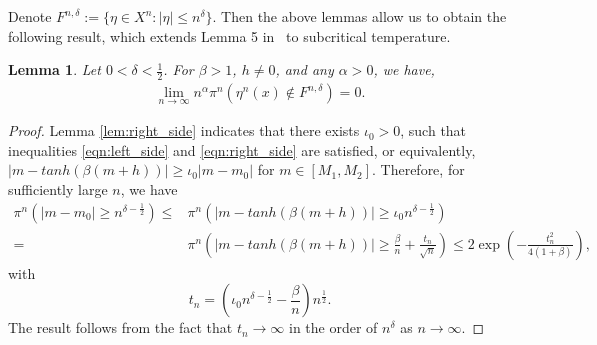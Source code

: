 \documentclass{amsart}
\newcommand{\al}{\alpha}                %
\newcommand{\ra}{\rightarrow}           %
\newtheorem{lem}[thm]{Lemma}
\begin{document}
          Denote
         		$F^{n,\delta}:=\{\eta\in X^n: |\eta|\le n^\delta\}$.
         Then the above lemmas allow us to obtain the following result, which extends Lemma 5 in~\cite{bierkens2017} to subcritical temperature. 
         \begin{lem}
         	\label{lem:outsideF}
         	Let $0<\delta<\frac12$. For $\beta>1$, $h\neq 0$, and any $\al>0$, we have, 
         	\begin{align*}
         		\lim_{n\ra \infty} n^\al \pi^n(\eta^n(x) \notin F^{n,\delta}) =0.
         	\end{align*}
         \end{lem}
         \begin{proof}
         	Lemma \ref{lem:right_side} indicates that there exists $\iota_0>0$, such that inequalities \eqref{eqn:left_side} and \eqref{eqn:right_side} are satisfied,
         	or equivalently, $|m- tanh(\beta(m+h))| \ge \iota_0 |m-m_0|$ for $m \in[M_1, M_2]$. Therefore, for sufficiently large $n$, we have
         	\begin{align*}
         		\pi^n(|m-m_0| \ge n^{\delta-\frac12}) \le&\pi^n(|m- tanh(\beta(m+h))|  \ge \iota_0 n^{\delta-\frac12})
         		\\=& \pi^n\left(|m- tanh(\beta(m+h))|  \ge  \frac{\beta}{n}+\frac{t_n}{\sqrt{n}}\right)
         		\le 2\exp\left(-\frac{t_n^2}{4(1+\beta)}\right),
         	\end{align*}
         	with $$t_n=\left(\iota_0 n^{\delta-\frac12} -\frac{\beta}{n}\right)n^{\frac12}.$$
         	The result follows from the fact that $t_n\rightarrow \infty$ in the order of $n^\delta$ as $n\rightarrow \infty$. 
         \end{proof}
         
\end{document}
